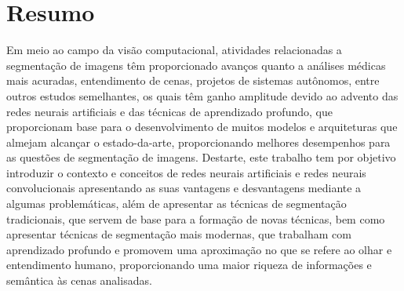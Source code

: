 \section*{Resumo}

Em meio ao campo da visão computacional, atividades relacionadas a segmentação de imagens têm proporcionado avanços quanto a análises médicas mais acuradas, entendimento de cenas, projetos de sistemas autônomos, entre outros estudos semelhantes, os quais têm ganho amplitude devido ao advento das redes neurais artificiais e das técnicas de aprendizado profundo, que proporcionam base para o desenvolvimento de muitos modelos e arquiteturas que almejam alcançar o estado-da-arte, proporcionando melhores desempenhos para as questões de segmentação de imagens.
Destarte, este trabalho tem por objetivo introduzir o contexto e conceitos de redes neurais artificiais e redes neurais convolucionais apresentando as suas vantagens e desvantagens mediante a algumas problemáticas, além de apresentar as técnicas de segmentação tradicionais, que servem de base para a formação de novas técnicas, bem como apresentar técnicas de segmentação mais modernas, que trabalham com aprendizado profundo e promovem uma aproximação no que se refere ao olhar e entendimento humano, proporcionando uma maior riqueza de informações e semântica às cenas analisadas. 
